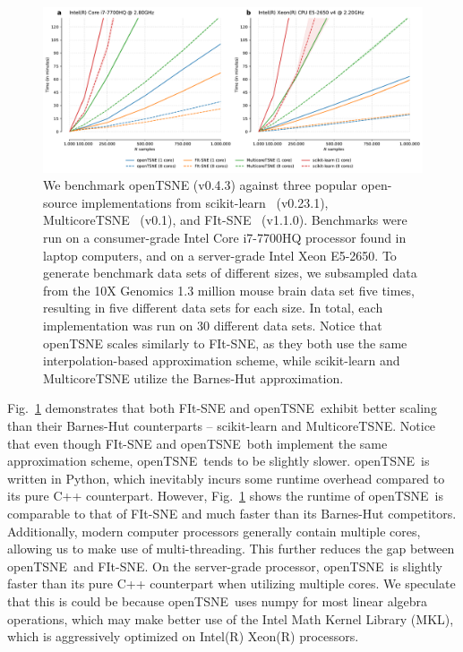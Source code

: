 \documentclass[twocolumn]{bmcart}
\newcommand{\opentsne}{\textsf{openTSNE}}
\begin{document}
\begin{figure}[htbp]
  \includegraphics[width=\textwidth]{benchmarks}
  \caption{\label{fig:benchmarks}We benchmark openTSNE (v0.4.3) against three
	popular open-source implementations from
	scikit-learn~\cite{pedregosa2011scikit} (v0.23.1),
	MulticoreTSNE~\cite{Ulyanov2016} (v0.1), and
	FIt-SNE~\cite{linderman2019fast} (v1.1.0). Benchmarks were run on a
	consumer-grade Intel Core i7-7700HQ processor found in laptop
	computers, and on a server-grade Intel Xeon E5-2650. To generate
	benchmark data sets of different sizes, we subsampled data from the 10X
	Genomics 1.3 million mouse brain data set five times, resulting in five
	different data sets for each size. In total, each implementation was
	run on 30 different data sets. Notice that openTSNE scales similarly to
	FIt-SNE, as they both use the same interpolation-based approximation
	scheme, while scikit-learn and MulticoreTSNE utilize the Barnes-Hut
	approximation.}
\end{figure}

Fig.~\ref{fig:benchmarks} demonstrates that both \textsf{FIt-SNE} and
\opentsne\ exhibit better scaling than their Barnes-Hut
counterparts -- \textsf{scikit-learn} and \textsf{MulticoreTSNE}. Notice that
even though \textsf{FIt-SNE} and \opentsne\ both implement the same
approximation scheme, \opentsne\ tends to be slightly slower. \opentsne\ is
written in Python, which inevitably incurs some runtime overhead compared to
its pure C++ counterpart. However, Fig.~\ref{fig:benchmarks} shows the
runtime of \opentsne\ is comparable to that of \textsf{FIt-SNE} and much faster
than its Barnes-Hut competitors. Additionally, modern computer processors
generally contain multiple cores, allowing us to make use of multi-threading.
This further reduces the gap between \opentsne\ and \textsf{FIt-SNE}. On the
server-grade processor, \opentsne\ is slightly faster than its pure C++
counterpart when utilizing multiple cores. We speculate that this is could be because \opentsne\ uses
\textsf{numpy} for most linear algebra operations, which may make better use of
the Intel Math Kernel Library (MKL), which is aggressively optimized on
Intel(R) Xeon(R) processors.
\end{document}
